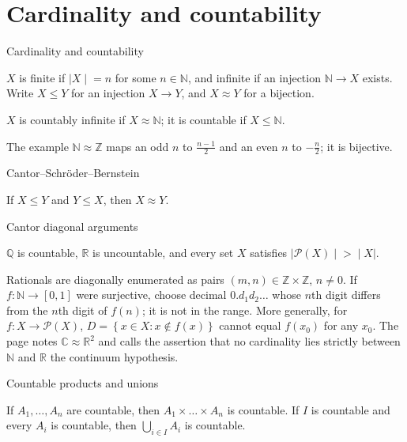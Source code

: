 \section{Cardinality and countability}

\begin{definition}{Cardinality and countability}

\(X\) is finite if \(\left. |X \middle| = n \right.\) for some \(n \in \mathbb{N}\), and infinite if an injection \(\mathbb{N}\rightarrow X\) exists. Write \(X \leq Y\) for an injection \(X\rightarrow Y\), and \(X \approx Y\) for a bijection.

\(X\) is countably infinite if \(X \approx \mathbb{N}\); it is countable if \(X \leq \mathbb{N}\).

\end{definition}

The example \(\mathbb{N} \approx \mathbb{Z}\) maps an odd \(n\) to \(\frac{n - 1}{2}\) and an even \(n\) to \(- \frac{n}{2}\); it is bijective.

\begin{theorem}{Cantor--Schröder--Bernstein}

If \(X \leq Y\) and \(Y \leq X\), then \(X \approx Y\).

\end{theorem}

\begin{theorem}{Cantor diagonal arguments}

\(\mathbb{Q}\) is countable, \(\mathbb{R}\) is uncountable, and every set \(X\) satisfies \(\left. |\mathcal{P}(X) \middle| > \middle| X| \right.\).

\end{theorem}

Rationals are diagonally enumerated as pairs \(\left( {m,n} \right) \in \mathbb{Z} \times \mathbb{Z}\), \(n \neq 0\). If \(f:\mathbb{N}\rightarrow\left\lbrack {0,1} \right\rbrack\) were surjective, choose decimal \(0.d_{1}d_{2}\ldots\) whose \(n\)th digit differs from the \(n\)th digit of \(f(n)\); it is not in the range. More generally, for \(f:X\rightarrow\mathcal{P}(X)\), \(D = \left\{ {x \in X:x \notin f(x)} \right\}\) cannot equal \(f\left( x_{0} \right)\) for any \(x_{0}\). The page notes \(\mathbb{C} \approx \mathbb{R}^{2}\) and calls the assertion that no cardinality lies strictly between \(\mathbb{N}\) and \(\mathbb{R}\) the continuum hypothesis.

\begin{theorem}{Countable products and unions}

If \(A_{1},\ldots,A_{n}\) are countable, then \(A_{1} \times \ldots \times A_{n}\) is countable. If \(I\) is countable and every \(A_{i}\) is countable, then \(\bigcup_{i \in I}A_{i}\) is countable.

\end{theorem}

